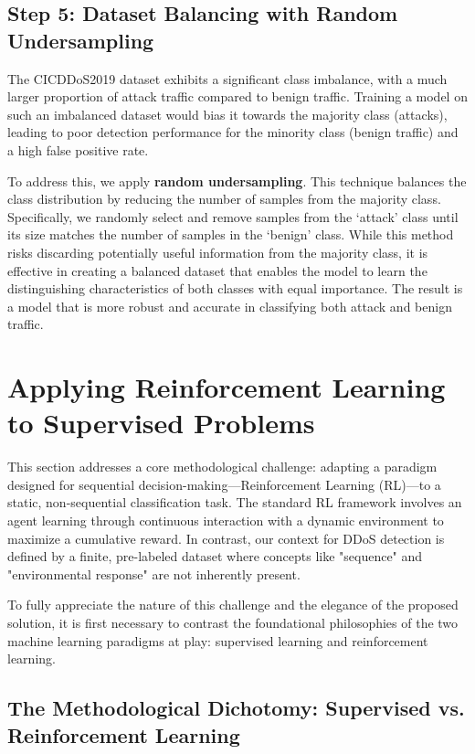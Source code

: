 \documentclass{report}
\begin{document}
\subsection{Step 5: Dataset Balancing with Random Undersampling}

The CICDDoS2019 dataset exhibits a significant class imbalance, with a much larger proportion of attack traffic compared to benign traffic. Training a model on such an imbalanced dataset would bias it towards the majority class (attacks), leading to poor detection performance for the minority class (benign traffic) and a high false positive rate.

To address this, we apply \textbf{random undersampling}. This technique balances the class distribution by reducing the number of samples from the majority class. Specifically, we randomly select and remove samples from the `attack' class until its size matches the number of samples in the `benign' class. While this method risks discarding potentially useful information from the majority class, it is effective in creating a balanced dataset that enables the model to learn the distinguishing characteristics of both classes with equal importance. The result is a model that is more robust and accurate in classifying both attack and benign traffic.

\section{Applying Reinforcement Learning to Supervised Problems}

This section addresses a core methodological challenge: adapting a paradigm designed for sequential decision-making—Reinforcement Learning (RL)—to a static, non-sequential classification task. The standard RL framework involves an agent learning through continuous interaction with a dynamic environment to maximize a cumulative reward. In contrast, our context for DDoS detection is defined by a finite, pre-labeled dataset where concepts like "sequence" and "environmental response" are not inherently present.

To fully appreciate the nature of this challenge and the elegance of the proposed solution, it is first necessary to contrast the foundational philosophies of the two machine learning paradigms at play: supervised learning and reinforcement learning.

\subsection{The Methodological Dichotomy: Supervised vs. Reinforcement Learning}
\end{document}
